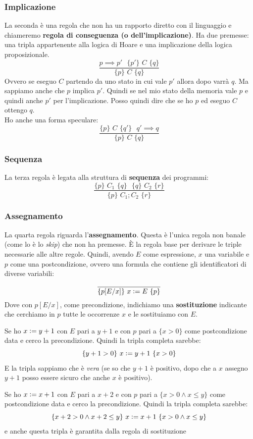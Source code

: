\documentclass[a4paper,12pt, oneside]{book}
\def\cceq{\mathrel{\vcenter{\hbox{:}}{=}}}
\begin{document}
\subsubsection{Implicazione}
\begin{definizione}
  La seconda è una regola che non ha un rapporto diretto con il linguaggio e
  chiameremo \textbf{regola di conseguenza (o dell'implicazione)}. Ha due
  premesse: una tripla appartenente alla logica di Hoare e una implicazione della
  logica proposizionale.
  \[\frac{p\implies p'\,\, \,\,\{p'\}\,\,C\,\,\{q\}}{\{p\}\,\,C\,\,\{q\}}\]
  Ovvero se eseguo $C$ partendo da uno stato in cui vale $p'$ allora dopo varrà
  $q$. Ma sappiamo anche che $p$ implica $p'$. Quindi se nel mio stato della
  memoria vale $p$ e quindi anche $p'$ per l'implicazione. Posso quindi dire che
  se ho $p$ ed eseguo $C$ ottengo $q$.\\
  Ho anche una forma speculare:
  \[\frac{\{p\}\,\,C\,\,\{q'\}\,\, \,\,q'\implies q}{\{p\}\,\,C\,\,\{q\}}\]
\end{definizione}
\subsubsection{Sequenza}
\begin{definizione}
  La terza regola è legata alla struttura di \textbf{sequenza} dei programmi:
  \[\frac{\{p\}\,\,C_1\,\,\{q\}\,\,
      \,\,\{q\}\,\,C_2\,\,\{r\}}{\{p\}\,\,C_1;C_2\,\,\{r\}}\] 
\end{definizione}
\subsubsection{Assegnamento}
\begin{definizione}
  La quarta regola riguarda l'\textbf{assegnamento}. Questa è l'unica regola
  non banale (come lo è lo \textit{skip}) che non ha premesse. È la regola base
  per derivare le triple necessarie alle altre regole. Quindi, avendo $E$ come
  espressione, $x$ una variabile e $p$ come una postcondizione, ovvero una
  formula che contiene gli identificatori di diverse variabili:
  \[\frac{}{\{p[E/x]\}\,\,x\cceq E\,\,\{p\}}\]
  Dove con $p[E/x]$, come precondizione, indichiamo una \textbf{sostituzione} 
  indicante che cerchiamo in $p$ tutte le occorrenze $x$ e le sostituiamo con $E$.
  \begin{esempio}
    Se ho $x \cceq y+1$ con $E$ pari a $y+1$ e con $p$ pari a $\{x>0\}$ come
    postcondizione data e cerco la precondizione. Quindi la tripla completa
    sarebbe: 
    \[\{y+1>0\}\,\,x \cceq y+1\,\,\{x>0\}\]
    E la tripla sappiamo che è \emph{vera} (se so che $y+1$ è positivo, dopo
    che a $x$ assegno $y+1$ posso essere sicuro che anche $x$ è positivo).
  \end{esempio}
  \begin{esempio}
    Se ho $x \cceq x+1$ con $E$ pari a $x+2$ e con $p$ pari a $\{x>0\land x\leq
    y\}$ come postcondizione data e cerco la precondizione. Quindi la tripla
    completa sarebbe:
    \[\{x+2>0\land x+2\leq y\}\,\,x \cceq x+1\,\,\{x>0\land x\leq y\}\]
    e anche questa tripla è garantita dalla regola di sostituzione
  \end{esempio}
\end{definizione}
\end{document}
